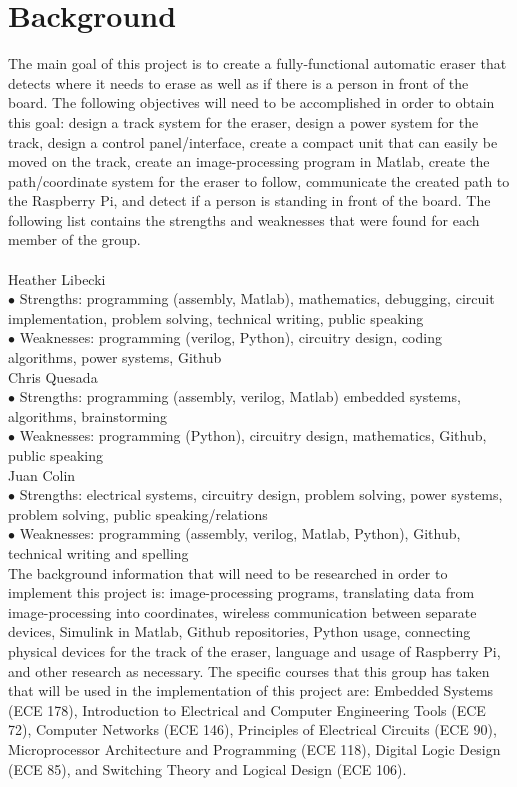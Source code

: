 \documentclass{IEEEtran}					%
\begin{document}
	\section{Background}
	The main goal of this project is to create a fully-functional automatic eraser that detects where it needs to erase as well as if there is a person in front of the board. The following objectives will need to be accomplished in order to obtain this goal: design a track system for the eraser, design a power system for the track, design a control panel/interface, create a compact unit that can easily be moved on the track, create an image-processing program in Matlab, create the path/coordinate system for the eraser to follow, communicate the created path to the Raspberry Pi, and detect if a person is standing in front of the board.
	The following list contains the strengths and weaknesses that were found for each member of the group.\\\\
	Heather Libecki\\
	$\bullet$ Strengths: programming (assembly, Matlab), mathematics, debugging, circuit implementation, problem solving, technical writing, public speaking\\
	$\bullet$ Weaknesses: programming (verilog, Python), circuitry design, coding algorithms, power systems, Github\\
	Chris Quesada\\
	$\bullet$ Strengths: programming (assembly, verilog, Matlab) embedded systems, algorithms, brainstorming\\
	$\bullet$ Weaknesses: programming (Python), circuitry design, mathematics, Github, public speaking\\
	Juan Colin\\
	$\bullet$ Strengths: electrical systems, circuitry design, problem solving, power systems, problem solving, public speaking/relations\\
	$\bullet$ Weaknesses: programming (assembly, verilog, Matlab, Python), Github, technical writing and spelling\\
	The background information that will need to be researched in order to implement this project is: image-processing programs, translating data from image-processing into coordinates, wireless communication between separate devices, Simulink in Matlab, Github repositories, Python usage, connecting physical devices for the track of the eraser, language and usage of Raspberry Pi, and other research as necessary. The specific courses that this group has taken that will be used in the implementation of this project are: Embedded Systems (ECE 178), Introduction to Electrical and Computer Engineering Tools (ECE 72), Computer Networks (ECE 146), Principles of Electrical Circuits (ECE 90), Microprocessor Architecture and Programming (ECE 118), Digital Logic Design (ECE 85), and Switching Theory and Logical Design (ECE 106).
	
\end{document}
